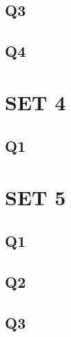 \documentclass{article}
\begin{document}
\subsection{Q3}

\subsection{Q4}

\section{SET 4}

\subsection{Q1}

\section{SET 5}

\subsection{Q1}

\subsection{Q2}

\subsection{Q3}
\end{document}
